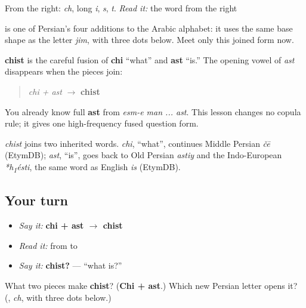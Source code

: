 From the right: \textbf{} \emph{ch}, \textbf{} long \emph{i}, \textbf{} \emph{s}, \textbf{} \emph{t}. \emph{Read it:} the word from the right

\textbf{} is one of Persian's four additions to the Arabic alphabet: it uses the same base shape as the letter \emph{jim}, with three dots below. Meet only this joined form now.

\begin{grammarlens}[title={Grammar Lens: two words compressed}]
\textbf{chist} is the careful fusion of \textbf{chi} “what” and \textbf{ast} “is.” The opening vowel of \emph{ast} disappears when the pieces join:

\begin{quote}
\emph{chi + ast} $\to$ \textbf{chist}
\end{quote}

You already know full \textbf{ast} from \emph{esm-e man ... ast}. This lesson changes no copula rule; it gives one high-frequency fused question form.
\end{grammarlens}

\begin{cousinweb}
\emph{chist} joins two inherited words. \emph{chi}, \textquotedblleft{}what\textquotedblright{}, continues Middle Persian \emph{čē} (EtymDB); \emph{ast}, \textquotedblleft{}is\textquotedblright{}, goes back to Old Persian \emph{astiy} and the Indo-European \emph{*h\textsubscript{1}ésti}, the same word as English \emph{is} (EtymDB).
\end{cousinweb}

\subsection*{Your turn}
\begin{itemize}
\raggedright
  \item \emph{Say it:} \textbf{chi + ast $\to$ chist}
  \item \emph{Read it:} \textbf{} from \textbf{} to \textbf{}
  \item \emph{Say it:} \textbf{chist?} — “what is?”
\end{itemize}

\begin{tcolorbox}[breakable,colback=teal!4,colframe=teal!35!black,title={Before you move on}]
What two pieces make \textbf{chist}? (\textbf{Chi + ast}.) Which new Persian letter opens it? (\textbf{}, \emph{ch}, with three dots below.)
\end{tcolorbox}
